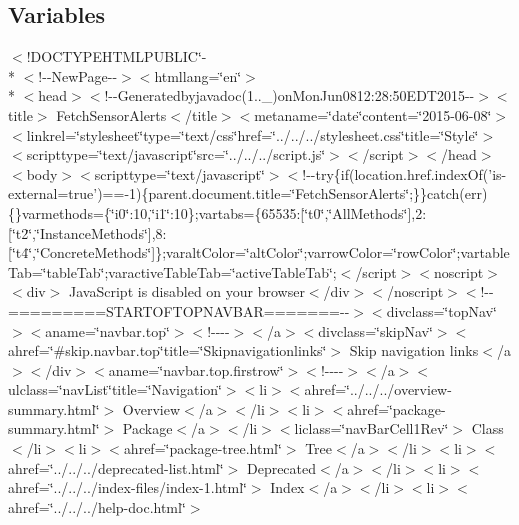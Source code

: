 \subsection*{Variables}
\begin{DoxyCompactItemize}
\item 
$<$!D\-O\-C\-T\-Y\-P\-E\-H\-T\-M\-L\-P\-U\-B\-L\-I\-C\char`\"{}-\/\\*
$<$!-\/-\/New\-Page-\/-\/$>$$<$htmllang=\char`\"{}en\char`\"{}$>$\\*
$<$head$>$$<$!-\/-\/Generatedbyjavadoc(1..\-\_)on\-Mon\-Jun0812\-:28\-:50\-E\-D\-T2015-\/-\/$>$$<$title$>$ Fetch\-Sensor\-Alerts$<$/title$>$$<$metaname=\char`\"{}date\char`\"{}content=\char`\"{}2015-\/06-\/08\char`\"{}$>$$<$linkrel=\char`\"{}stylesheet\char`\"{}type=\char`\"{}text/css\char`\"{}href=\char`\"{}../../../stylesheet.\-css\char`\"{}title=\char`\"{}\-Style\char`\"{}$>$$<$scripttype=\char`\"{}text/javascript\char`\"{}src=\char`\"{}../../../script.\-js\char`\"{}$>$$<$/script$>$$<$/head$>$$<$body$>$$<$scripttype=\char`\"{}text/javascript\char`\"{}$>$$<$!-\/-\/try\{if(location.\-href.\-index\-Of('is-\/external=true')==-\/1)\{parent.\-document.\-title=\char`\"{}\-Fetch\-Sensor\-Alerts\char`\"{};\}\}catch(err)\{\}varmethods=\{\char`\"{}i0\char`\"{}\-:10,\char`\"{}i1\char`\"{}\-:10\};vartabs=\{65535\-:\mbox{[}\char`\"{}t0\char`\"{},\char`\"{}\-All\-Methods\char`\"{}\mbox{]},2\-:\mbox{[}\char`\"{}t2\char`\"{},\char`\"{}\-Instance\-Methods\char`\"{}\mbox{]},8\-:\mbox{[}\char`\"{}t4\char`\"{},\char`\"{}\-Concrete\-Methods\char`\"{}\mbox{]}\};varalt\-Color=\char`\"{}alt\-Color\char`\"{};varrow\-Color=\char`\"{}row\-Color\char`\"{};vartable\-Tab=\char`\"{}table\-Tab\char`\"{};varactive\-Table\-Tab=\char`\"{}active\-Table\-Tab\char`\"{};$<$/script$>$$<$noscript$>$$<$div$>$ Java\-Script is disabled on your browser$<$/div$>$$<$/noscript$>$$<$!-\/-\/=========\-S\-T\-A\-R\-T\-O\-F\-T\-O\-P\-N\-A\-V\-B\-A\-R=======-\/-\/$>$$<$divclass=\char`\"{}top\-Nav\char`\"{}$>$$<$aname=\char`\"{}navbar.\-top\char`\"{}$>$$<$!-\/-\/-\/-\/$>$$<$/a$>$$<$divclass=\char`\"{}skip\-Nav\char`\"{}$>$$<$ahref=\char`\"{}\#skip.\-navbar.\-top\char`\"{}title=\char`\"{}\-Skipnavigationlinks\char`\"{}$>$ Skip navigation links$<$/a$>$$<$/div$>$$<$aname=\char`\"{}navbar.\-top.\-firstrow\char`\"{}$>$$<$!-\/-\/-\/-\/$>$$<$/a$>$$<$ulclass=\char`\"{}nav\-List\char`\"{}title=\char`\"{}\-Navigation\char`\"{}$>$$<$li$>$$<$ahref=\char`\"{}../../../overview-\/summary.\-html\char`\"{}$>$ Overview$<$/a$>$$<$/li$>$$<$li$>$$<$ahref=\char`\"{}package-\/summary.\-html\char`\"{}$>$ Package$<$/a$>$$<$/li$>$$<$liclass=\char`\"{}nav\-Bar\-Cell1\-Rev\char`\"{}$>$ Class$<$/li$>$$<$li$>$$<$ahref=\char`\"{}package-\/tree.\-html\char`\"{}$>$ Tree$<$/a$>$$<$/li$>$$<$li$>$$<$ahref=\char`\"{}../../../deprecated-\/list.\-html\char`\"{}$>$ Deprecated$<$/a$>$$<$/li$>$$<$li$>$$<$ahref=\char`\"{}../../../index-\/files/index-\/1.\-html\char`\"{}$>$ Index$<$/a$>$$<$/li$>$$<$li$>$$<$ahref=\char`\"{}../../../help-\/doc.\-html\char`\"{}$>$ $$
\end{DoxyCompactItemize}
